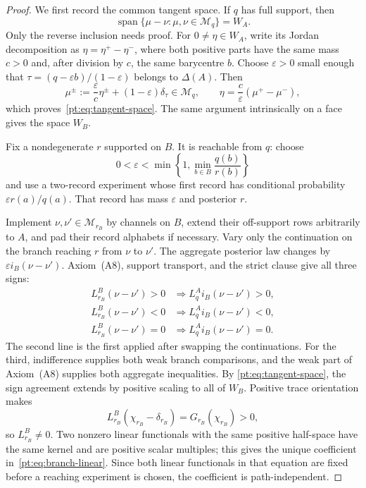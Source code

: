 \begin{proof}
We first record the common tangent space.  If $q$ has full support, then
\begin{equation}
 \operatorname{span}\{\mu-\nu:\mu,\nu\in\mathcal M_q\}=W_A.
\label{pt:eq:tangent-space}
\end{equation}
Only the reverse inclusion needs proof.  For $0\ne\eta\in W_A$, write its
Jordan decomposition as $\eta=\eta^+-\eta^-$, where both positive parts have
the same mass $c>0$ and, after division by $c$, the same barycentre $b$.
Choose $\varepsilon>0$ small enough that
$\tau=(q-\varepsilon b)/(1-\varepsilon)$ belongs to $\Delta(A)$.  Then
\[
 \mu^\pm:=\frac{\varepsilon}{c}\eta^\pm
          +(1-\varepsilon)\delta_\tau
 \in\mathcal M_q,
 \qquad
 \eta=\frac c\varepsilon(\mu^+-\mu^-),
\]
which proves~\eqref{pt:eq:tangent-space}.  The same argument intrinsically on
a face gives the space $W_B$.

Fix a nondegenerate $r$ supported on $B$.  It is reachable from $q$: choose
\[
 0<\varepsilon<\min\left\{1,
       \min_{b\in B}\frac{q(b)}{r(b)}\right\}
\]
and use a two-record experiment whose first record has conditional probability
$\varepsilon r(a)/q(a)$.  That record has mass $\varepsilon$ and posterior
$r$.

Implement $\nu,\nu'\in\mathcal M_{r_B}$ by channels on $B$, extend their
off-support rows arbitrarily to $A$, and pad their record alphabets if
necessary.  Vary only the continuation on the branch reaching $r$ from
$\nu$ to $\nu'$.  The aggregate posterior law changes by
$\varepsilon i_B(\nu-\nu')$.  Axiom~\textup{(A8)}, support transport, and the
strict clause give all three signs:
\begin{align*}
 L_{r_B}^B(\nu-\nu')>0&\Longrightarrow
     L_q^A i_B(\nu-\nu')>0,\\
 L_{r_B}^B(\nu-\nu')<0&\Longrightarrow
     L_q^A i_B(\nu-\nu')<0,\\
 L_{r_B}^B(\nu-\nu')=0&\Longrightarrow
     L_q^A i_B(\nu-\nu')=0.
\end{align*}
The second line is the first applied after swapping the continuations.  For
the third, indifference supplies both weak branch comparisons, and the weak
part of Axiom~\textup{(A8)} supplies both aggregate inequalities.  By
\eqref{pt:eq:tangent-space}, the sign agreement extends by positive scaling
to all of $W_B$.  Positive trace orientation makes
\[
 L_{r_B}^B(\chi_{r_B}-\delta_{r_B})
 =G_{r_B}(\chi_{r_B})>0,
\]
so $L_{r_B}^B\ne0$.  Two nonzero linear functionals with the same positive
half-space have the same kernel and are positive scalar multiples; this gives
the unique coefficient in~\eqref{pt:eq:branch-linear}.  Since both linear
functionals in that equation are fixed before a reaching experiment is
chosen, the coefficient is path-independent.


\end{proof}

